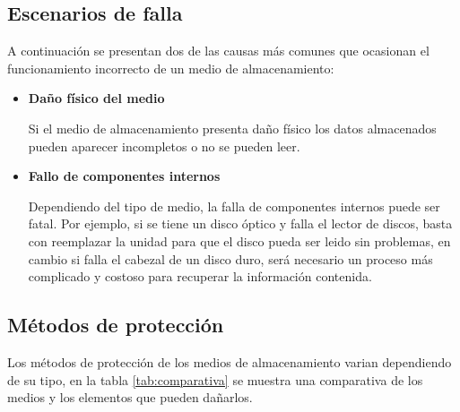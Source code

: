   \subsection {Escenarios de falla}

A continuaci\'{o}n se presentan dos de las causas m\'{a}s comunes que ocasionan el funcionamiento incorrecto de un medio de almacenamiento:

    \begin{itemize}

      \item \textbf{Da\~{n}o f\'{i}sico del medio}

Si el medio de almacenamiento presenta da\~{n}o f\'{i}sico los datos almacenados pueden aparecer incompletos o no se pueden leer.

      \item \textbf{Fallo de componentes internos}

Dependiendo del tipo de medio, la falla de componentes internos puede ser fatal. Por ejemplo, si se tiene un disco \'{o}ptico y falla el lector de discos, basta con reemplazar la unidad para que el disco pueda ser leido sin problemas, en cambio si falla el cabezal de un disco duro, ser\'{a} necesario un proceso m\'{a}s complicado y costoso para recuperar la informaci\'{o}n contenida.

    \end{itemize}

  \subsection {M\'{e}todos de protecci\'{o}n}

Los m\'{e}todos de protecci\'{o}n de los medios de almacenamiento varian dependiendo de su tipo, en la tabla \ref{tab:comparativa} se muestra una comparativa de los medios y los elementos que pueden da\~{n}arlos.

